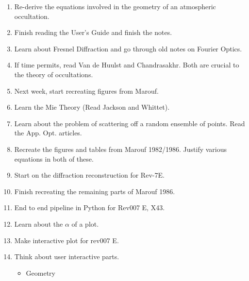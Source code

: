 \documentclass[crop=false,class=article,oneside]{standalone}
\begin{document}
        \begin{enumerate}
            \item Re-derive the equations involved
                  in the geometry of an atmospheric occultation.
            \item Finish reading the User's Guide and finish the notes.
            \item Learn about Fresnel Diffraction and go through
                  old notes on Fourier Optics.
            \item If time permits, read Van de Huulst and Chandrasakhr.
                  Both are crucial to the theory of occultations.
            \item Next week, start recreating figures from Marouf.
            \item Learn the Mie Theory (Read Jackson and Whittet).
            \item Learn about the problem of scattering off a random
                  ensemble of points. Read the App. Opt. articles.
            \item Recreate the figures and tables from Marouf 1982/1986.
                  Justify various equations in both of these.
            \item Start on the diffraction reconstruction for Rev-7E.
            \item Finish recreating the remaining parts of Marouf 1986.
            \item End to end pipeline in Python for Rev007 E, X43.
            \begin{itemize}
            \end{itemize}
            \item Learn about the $\alpha$ of a plot.
            \item Make interactive plot for rev007 E.
            \item Think about user interactive parts.
            \begin{itemize}
                \item Geometry
                \begin{itemize}

\end{itemize}
\end{itemize}
\end{enumerate}
\end{document}
